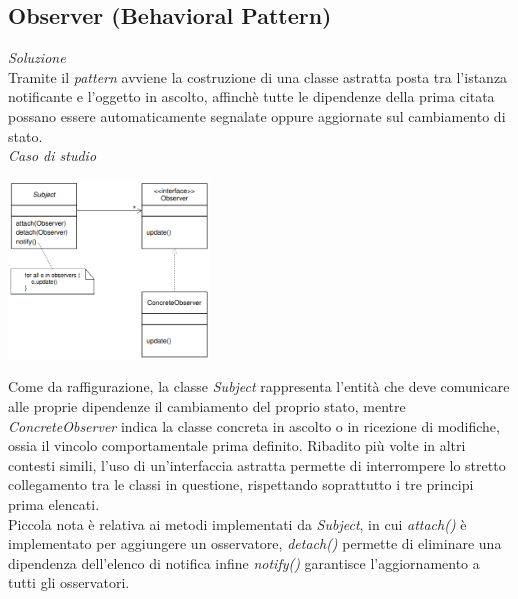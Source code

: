 \documentclass{article}
\begin{document}
\subsection*{Observer (Behavioral Pattern)}
\large
\textit{Soluzione}\\
Tramite il \textit{pattern} avviene la costruzione di una classe astratta posta tra l'istanza notificante e l'oggetto in ascolto, affinchè tutte le dipendenze della prima citata possano essere automaticamente segnalate oppure aggiornate sul cambiamento di stato.\vspace*{14pt}\\
\textit{Caso di studio}\\
\begin{center}
    \includegraphics[width=0.4\textwidth]{foto 3.png}
\end{center}
Come da raffigurazione, la classe \textit{Subject} rappresenta l'entità che deve comunicare alle proprie dipendenze il cambiamento del proprio stato, mentre \textit{ConcreteObserver} indica la classe concreta in ascolto o in ricezione di modifiche, ossia il vincolo comportamentale prima definito. Ribadito più volte in altri contesti simili, l'uso di un'interfaccia astratta permette di interrompere lo stretto collegamento tra le classi in questione, rispettando soprattutto i tre principi prima elencati.\vspace*{7pt}\\
Piccola nota è relativa ai metodi implementati da \textit{Subject}, in cui \textit{attach()} è implementato per aggiungere un osservatore, \textit{detach()} permette di eliminare una dipendenza dell'elenco di notifica infine \textit{notify()} garantisce l'aggiornamento a tutti gli osservatori. 
\end{document}
